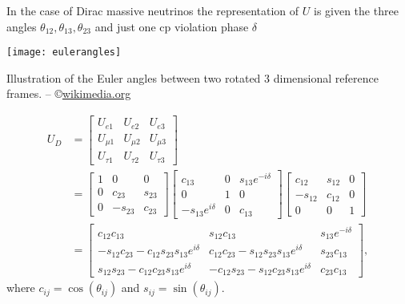 In the case of Dirac massive neutrinos the representation of $U$ is given the three angles $\theta_{12}, \theta_{13}, \theta_{23}$ and just one \gls{cp} violation phase $\delta$
\begin{marginfigure}
  \centering
  \vspace*{1em}
  \texttt{[image: eulerangles]}
  \caption{Illustration of the Euler angles between two rotated 3 dimensional reference frames.
  -- \copyright \href{https://commons.wikimedia.org/wiki/File:Euler.png}{wikimedia.org}}
  \label{fig:euler_angles}
\end{marginfigure}
\begin{align*}
  U_D &= \begin{bmatrix}
      U_{e 1} & U_{e 2} & U_{e 3} \\
      U_{\mu 1} & U_{\mu 2} & U_{\mu 3} \\
      U_{\tau 1} & U_{\tau 2} & U_{\tau 3}
    \end{bmatrix} \\
    &= \begin{bmatrix}
      1 & 0 & 0 \\
      0 & c_{23} & s_{23} \\
      0 & -s_{23} & c_{23}
    \end{bmatrix} \begin{bmatrix}
      c_{13} & 0 & s_{13}e^{-i\delta} \\
      0 & 1 & 0 \\
      -s_{13}e^{i\delta} & 0 & c_{13}
    \end{bmatrix} \begin{bmatrix}
      c_{12} & s_{12} & 0 \\
      -s_{12} & c_{12} & 0 \\
      0 & 0 & 1
    \end{bmatrix} \\
    &= \begin{bmatrix}
      c_{12}c_{13} & s_{12}c_{13} & s_{13}e^{-i\delta} \\
      -s_{12}c_{23} - c_{12}s_{23}s_{13}e^{i\delta} & c_{12}c_{23} - s_{12}s_{23}s_{13}e^{i\delta} & s_{23}c_{13} \\
      s_{12}s_{23} - c_{12}c_{23}s_{13}e^{i\delta} & -c_{12}s_{23} - s_{12}c_{23}s_{13}e^{i\delta} & c_{23}c_{13}
    \end{bmatrix},
\end{align*}
where $c_{ij} = \cos(\theta_{ij})$ and $s_{ij} = \sin(\theta_{ij})$.

